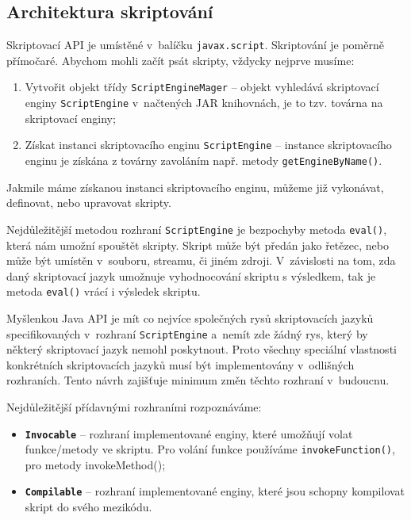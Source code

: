 \subsection{Architektura skriptování}
\label{Chapter.JavaScriptInJavaAnalysis.ScriptingJavaAPI.ArchitectureOfScripting}

\bigskip \noindent Skriptovací API je umístěné v~balíčku \texttt{javax.script}. Skriptování je poměrně přímočaré. Abychom mohli začít psát skripty, vždycky nejprve musíme:

\begin{enumerate}
  \item Vytvořit objekt třídy \texttt{ScriptEngineMager} -- objekt vyhledává skriptovací enginy \texttt{ScriptEngine} v~načtených JAR knihovnách, je to tzv. továrna na skriptovací enginy;
  \item Získat instanci skriptovacího enginu \texttt{ScriptEngine} -- instance skriptovacího enginu je získána z továrny zavoláním např. metody \texttt{getEngineByName()}. 
\end{enumerate}

Jakmile máme získanou instanci skriptovacího enginu, můžeme již vykonávat, definovat, nebo upravovat skripty.

Nejdůležitější metodou rozhraní \texttt{ScriptEngine} je bezpochyby metoda \texttt{eval()}, která nám umožní spouštět skripty. Skript může být předán jako řetězec, nebo může být umístěn v~souboru, streamu, či jiném zdroji. V~závislosti na tom, zda daný skriptovací jazyk umožnuje vyhodnocování skriptu s výsledkem, tak je metoda \texttt{eval()} vrácí i výsledek skriptu.

Myšlenkou Java API je mít co nejvíce společných rysů skriptovacích jazyků specifikovaných v~rozhraní \texttt{ScriptEngine} a~nemít zde žádný rys, který by některý skriptovací jazyk nemohl poskytnout. Proto všechny speciální vlastnosti konkrétních skriptovacích jazyků musí být implementovány v~odlišných rozhraních. Tento návrh zajišťuje minimum změn těchto rozhraní v~budoucnu. 

\bigskip \noindent Nejdůležitější přídavnými rozhraními rozpoznáváme:

\begin{itemize}
  \item \textbf{\texttt{Invocable}} -- rozhraní implementované enginy, které umožňují volat funkce/metody ve skriptu. Pro volání funkce používáme \texttt{invokeFunction()}, pro metody invokeMethod();
  \item \textbf{\texttt{Compilable}} -- rozhraní implementované enginy, které jsou schopny kompilovat skript do svého mezikódu.
\end{itemize}

